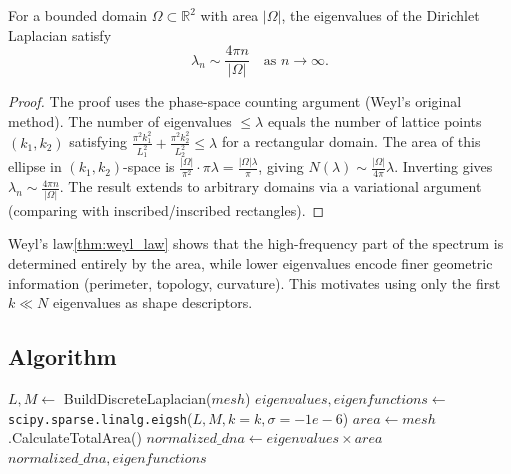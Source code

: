 \begin{theorem}\label{thm:weyl_law}
For a bounded domain $\Omega \subset \mathbb{R}^2$ with area $|\Omega|$, the eigenvalues of the Dirichlet Laplacian satisfy
$$\lambda_n \sim \frac{4\pi n}{|\Omega|} \quad \text{as } n \to \infty.$$
\end{theorem}
\begin{proof}
The proof uses the phase-space counting argument (Weyl's original method). The number of eigenvalues $\le \lambda$ equals the number of lattice points $(k_1, k_2)$ satisfying $\frac{\pi^2 k_1^2}{L_1^2} + \frac{\pi^2 k_2^2}{L_2^2} \le \lambda$ for a rectangular domain. The area of this ellipse in $(k_1, k_2)$-space is $\frac{|\Omega|}{\pi^2} \cdot \pi \lambda = \frac{|\Omega| \lambda}{\pi}$, giving $N(\lambda) \sim \frac{|\Omega|}{4\pi} \lambda$. Inverting gives $\lambda_n \sim \frac{4\pi n}{|\Omega|}$. The result extends to arbitrary domains via a variational argument (comparing with inscribed/inscribed rectangles).
\end{proof}

\begin{remark}
Weyl's law\cref{thm:weyl_law} shows that the high-frequency part of the spectrum is determined entirely by the area, while lower eigenvalues encode finer geometric information (perimeter, topology, curvature). This motivates using only the first $k \ll N$ eigenvalues as shape descriptors.
\end{remark}



\subsection{Algorithm}
\begin{algorithm}
\caption{Shape-DNA Computation\label{alg:shape_dna}}
\begin{algorithmic}[1]
  \State $L, M \gets$ BuildDiscreteLaplacian($mesh$) 
  \State $eigenvalues, eigenfunctions \gets$ \texttt{scipy.sparse.linalg.eigsh}($L, M, k{=}k, \sigma{=}{-}1e{-}6$)
  \State $area \gets mesh$.CalculateTotalArea()
  \State $normalized\_dna \gets eigenvalues \times area$
  \State \Return $normalized\_dna, eigenfunctions$
\EndFunction
\end{algorithmic}
\end{algorithm}

